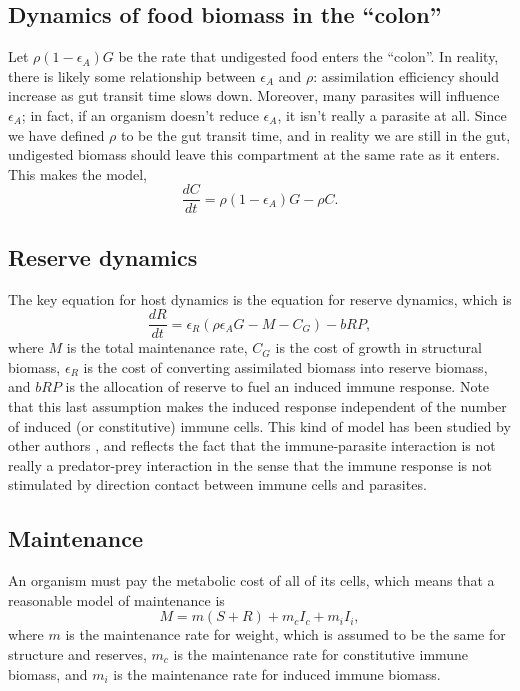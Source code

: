 \documentclass[11pt,reqno,final,pdftex]{amsart}\usepackage[]{graphicx}\usepackage[]{color}
\theoremstyle{plain}
\numberwithin{equation}{part}
\begin{document}
\subsection*{Dynamics of food biomass in the ``colon''}
Let $\rho (1-\epsilon_A) G$ be the rate that undigested food enters the ``colon''.
In reality, there is likely some relationship between $\epsilon_A$ and $\rho$: assimilation efficiency should increase as gut transit time slows down.
Moreover, many parasites will influence $\epsilon_A$; in fact, if an organism doesn't reduce $\epsilon_A$, it isn't really a parasite at all.
Since we have defined $\rho$ to be the gut transit time, and in reality we are still in the gut, undigested biomass should leave this compartment at the same rate as it enters.
This makes the model,
\begin{equation}
\frac{dC}{dt} = \rho (1-\epsilon_A)G - \rho C.
\end{equation}

\subsection*{Reserve dynamics}
The key equation for host dynamics is the equation for reserve dynamics, which is
\begin{equation}
\frac{dR}{dt}=\epsilon _R\left(\rho \epsilon_A G-M-C_G\right)-b R P,
\end{equation}
where $M$ is the total maintenance rate, $C_G$ is the cost of growth in structural biomass, $\epsilon _R$ is the cost of converting assimilated biomass into reserve biomass, and $bRP$ is the allocation of reserve to fuel an induced immune response.
Note that this last assumption makes the induced response independent of the number of induced (or constitutive) immune cells.
This kind of model has been studied by other authors \citep{Bonhoeffer1994,Alizon2005,Fenton2006,Hamilton2008}, and reflects the fact that the immune-parasite interaction is not really a predator-prey interaction in the sense that the immune response is not stimulated by direction contact between immune cells and parasites.

\subsection*{Maintenance}
An organism must pay the metabolic cost of all of its cells, which means that a reasonable model of maintenance is
\begin{equation}
M=m(S+R)+m_cI_c+m_iI_i,
\end{equation}
where $m$ is the maintenance rate for weight, which is assumed to be the same for structure and reserves, $m_c$ is the maintenance rate for constitutive immune biomass, and $m_i$ is the maintenance rate for induced immune biomass.
\end{document}
